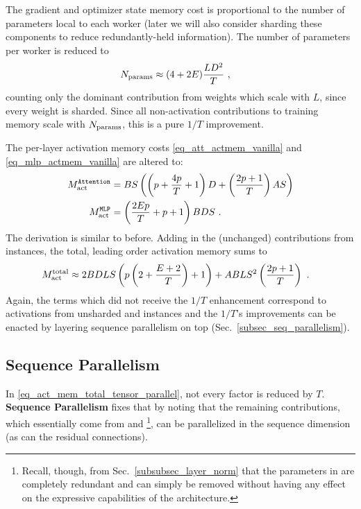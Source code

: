 \documentclass[11pt]{article}
\begin{document}
The gradient and optimizer state memory cost is proportional to the number of parameters local to
each worker (later we will also consider sharding these components to reduce redundantly-held
information). The number of parameters per worker is reduced to
\begin{align}
	N _{ \rm params } & \approx  (4 + 2E) \frac{ L D ^{ 2 } }{ T }\ ,
	\label{eq_approx_params_tensor_parallel}
\end{align}
counting only the dominant contribution from weights which scale with $ L $, since every weight is
sharded. Since all non-activation contributions to training memory scale with $ N _{ {\rm params}  }
$, this is a pure $ 1/T $ improvement.

The per-layer activation memory costs \eqref{eq_att_actmem_vanilla} and
\eqref{eq_mlp_actmem_vanilla} are altered to:
\begin{align}
	M _{ \rm act  } ^\texttt{Attention} & = BS \left ( \left (p + \frac{ 4p }{ T }+1 \right )D + \left
		(\frac{ 2p+1 }{ T } \right )AS  \right ) \nonumber\\
	M _{ \rm act  } ^\texttt{MLP}       & = \left (\frac{ 2Ep }{ T }+p+1 \right )BDS\ .
	\label{eq_act_mem_attn_mlp}
\end{align}
The derivation is similar to before. Adding in the (unchanged) contributions from
 instances, the total, leading order activation memory sums to
\begin{align}
	M _{ {\rm act}  } ^{ {\rm  total}  } & \approx  2BDLS   \left ( p \left (2+ \frac{ E+2 }{ T }\right ) + 1   \right )
	+ ABLS ^{ 2 } \left ( \frac{ 2p+1 }{ T }\right ) \label{eq_act_mem_total_tensor_parallel}\ .
\end{align}
Again, the terms which did not receive the $ 1/T $ enhancement correspond to activations from
unsharded  and  instances and the $ 1/T $'s improvements can
be enacted by layering sequence parallelism on top (Sec.~\ref{subsec_seq_parallelism}).


\subsection{Sequence Parallelism \label{subsec_seq_parallelism}}

In \eqref{eq_act_mem_total_tensor_parallel}, not every factor is reduced by $ T $. \textbf{Sequence
	Parallelism} fixes that by noting that the remaining contributions, which essentially come from
 and \footnote{Recall, though, from
	Sec.~\ref{subsubsec_layer_norm} that the parameters in  are completely redundant
	and can simply be removed without having any effect on the expressive capabilities of the
	architecture.}, can be parallelized in the sequence dimension (as can the residual connections).
\end{document}
